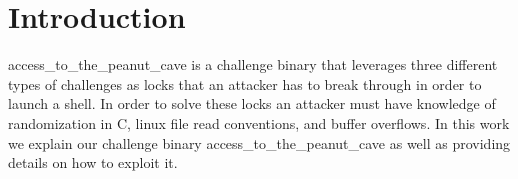 \section{Introduction}
access\_to\_the\_peanut\_cave is a challenge binary that leverages three different types of challenges as locks that an attacker has to break through in order to launch a shell. In order to solve these locks an attacker must have knowledge of randomization in C, linux file read conventions, and buffer overflows. In this work we explain our challenge binary access\_to\_the\_peanut\_cave as well as providing details on how to exploit it. 
